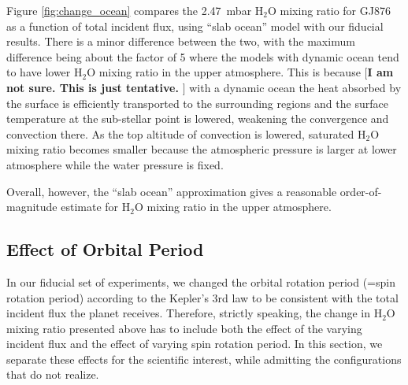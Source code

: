 \documentclass[11pt,numberedappendix,twocolappendix,]{emulateapj}
\def\water{H$_2$O }
\def\preslevel{2.47}
\def\memo#1{\color{red}$[${\bf #1}$]$ \color{black}}
\begin{document}
Figure \ref{fig:change_ocean} compares the \preslevel ~mbar \water mixing ratio for GJ876 as a function of total incident flux, using ``slab ocean'' model with our fiducial results. 
There is a minor difference between the two, with the maximum difference being about the factor of 5 where the models with dynamic ocean tend to have lower \water mixing ratio in the upper atmosphere. 
This is because \memo{I am not sure. This is just tentative. } with a dynamic ocean the heat absorbed by the surface is efficiently transported to the surrounding regions and the surface temperature at the sub-stellar point is lowered, weakening the convergence and convection there.
As the top altitude of convection is lowered, saturated \water mixing ratio becomes smaller because the atmospheric pressure is larger at lower atmosphere while the water pressure is fixed. 

Overall, however, the ``slab ocean'' approximation gives a reasonable order-of-magnitude estimate for \water mixing ratio in the upper atmosphere. 

\subsection{Effect of Orbital Period}
\label{ss:sensitivity_Porbit}

In our fiducial set of experiments, we changed the orbital rotation period (=spin rotation period) according to the Kepler's 3rd law to be consistent with the total incident flux the planet receives. 
Therefore, strictly speaking, the change in \water mixing ratio presented above has to include both the effect of the varying incident flux and the effect of varying spin rotation period. 
In this section, we separate these effects for the scientific interest, while admitting the configurations that do not realize. 
\end{document}
